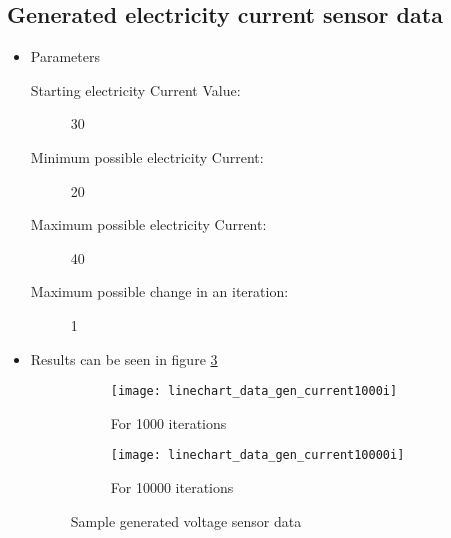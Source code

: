                     \subsection{Generated electricity current sensor data}
                        \begin{itemize}
                            \item Parameters
                                \begin{description}
                                    \item[Starting electricity Current Value:] 30
                                    \item[Minimum possible electricity Current:] 20
                                    \item[Maximum possible electricity Current:] 40
                                    \item[Maximum possible change in an iteration:] 1
                                \end{description}
                            \item Results can be seen in figure \ref{fig:gen_current}
                                \begin{figure}
                                    \centering
                                    \captionsetup{type=figure}
                                    \begin{subfigure}[b]{0.45\textwidth}
                                        \centering
                                        \texttt{[image: linechart\_data\_gen\_current1000i]}
                                        \caption{For 1000 iterations}
                                        \label{chart:gen_current_1000}
                                    \end{subfigure}
                                    \hfill
                                    \begin{subfigure}[b]{0.45\textwidth}
                                        \centering
                                        \texttt{[image: linechart\_data\_gen\_current10000i]}
                                        \caption{For 10000 iterations}
                                        \label{chart:gen_current_10000}
                                    \end{subfigure}
                                    
                                    \caption{Sample generated voltage sensor data }
                                    \label{fig:gen_current}
                            \end{figure}
                        \end{itemize}
        
